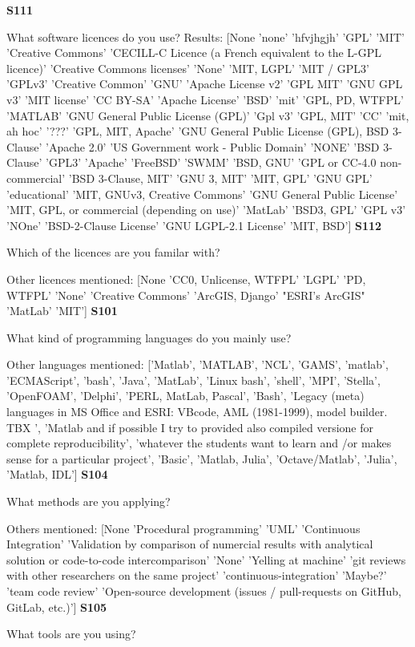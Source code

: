 \textbf{S111}

What software licences do you use? Results: [None 'none' 'hfvjhgjh' 'GPL' 'MIT' 'Creative Commons'
 'CECILL-C Licence (a French equivalent to the L-GPL licence)'
 'Creative Commons licenses' 'None' 'MIT, LGPL' 'MIT / GPL3' 'GPLv3'
 'Creative Common' 'GNU' 'Apache License v2' 'GPL MIT' 'GNU GPL v3'
 'MIT license' 'CC BY-SA' 'Apache License' 'BSD' 'mit' 'GPL, PD, WTFPL'
 'MATLAB' 'GNU General Public License (GPL)' 'Gpl v3' 'GPL, MIT' 'CC'
 'mit, ah hoc' '???' 'GPL, MIT, Apache'
 'GNU General Public License (GPL), BSD 3-Clause' 'Apache 2.0'
 'US Government work - Public Domain' 'NONE' 'BSD 3-Clause' 'GPL3'
 'Apache' 'FreeBSD' 'SWMM' 'BSD, GNU' 'GPL or CC-4.0 non-commercial'
 'BSD 3-Clause, MIT' 'GNU 3, MIT' 'MIT, GPL' 'GNU GPL' 'educational'
 'MIT, GNUv3, Creative Commons' 'GNU General Public License'
 'MIT, GPL, or commercial (depending on use)' 'MatLab' 'BSD3, GPL'
 'GPL v3' 'NOne' 'BSD-2-Clause License' 'GNU LGPL-2.1 License' 'MIT, BSD'] 
\textbf{S112}

Which of the licences are you familar with?

Other licences mentioned: [None 'CC0, Unlicense, WTFPL' 'LGPL' 'PD, WTFPL' 'None' 'Creative Commons'
 'ArcGIS, Django' "ESRI's ArcGIS" 'MatLab' 'MIT']
\textbf{S101}

What kind of programming languages do you mainly use? 

Other languages mentioned: ['Matlab', 'MATLAB', 'NCL', 'GAMS', 'matlab', 'ECMAScript', 'bash', 'Java', 'MatLab', 'Linux bash', 'shell', 'MPI', 'Stella', 'OpenFOAM', 'Delphi', 'PERL, MatLab, Pascal', 'Bash', 'Legacy (meta) languages in MS Office and ESRI: VBcode, AML (1981-1999), model builder. TBX ', 'Matlab and if possible I try to provided also compiled versione for complete reproducibility', 'whatever the students want to learn and /or makes sense for a particular project', 'Basic', 'Matlab, Julia', 'Octave/Matlab', 'Julia', 'Matlab, IDL']
\textbf{S104}

What methods are you applying?

Others mentioned: [None 'Procedural programming' 'UML' 'Continuous Integration'
 'Validation by comparison of numercial results with analytical solution or code-to-code intercomparison'
 'None' 'Yelling at machine'
 'git reviews with other researchers on the same project'
 'continuous-integration' 'Maybe?' 'team code review'
 'Open-source development (issues / pull-requests on GitHub, GitLab, etc.)']
\textbf{S105}

What tools are you using?

